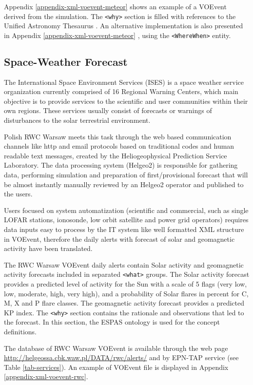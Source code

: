 \documentclass[referee,a4paper,12pt,traditabstract]{swsc}
\begin{document}
\begin{linenumbers}
Appendix \ref{appendix-xml-voevent-meteor} shows an example of a VOEvent derived from the simulation. The {\tt <why>} section is filled with references to the Unified Astronomy Thesaurus \cite{2014ASPC..485..461A}. An alternative implementation is also presented in Appendix \ref{appendix-xml-voevent-meteor} , using the {\tt <WhereWhen>} entity. 

\subsection{Space-Weather Forecast}
The International Space Environment Services (ISES) is a space weather service organization currently comprised of 16 Regional Warning Centers, which main objective is to provide services to the scientific and user communities within their own regions. These services usually consist of forecasts or warnings of disturbances to the solar terrestrial environment.

Polish RWC Warsaw meets this task through the web based communication channels like http and email protocols based on traditional codes and human readable text messages, created by the Heliogeophysical Prediction Service Laboratory. The data processing system (Helgeo2) is responsible for gathering data, performing simulation and preparation of first/provisional forecast that will be almost instantly manually reviewed by an Helgeo2 operator and published to the users. 

Users focused on system automatization (scientific and commercial, such as single LOFAR stations, ionosonde, low orbit satellite and power grid operators) requires data inputs easy to process by the IT system like well formatted XML structure in VOEvent, therefore the daily alerts with forecast of solar and geomagnetic activity have been translated. 

The RWC Warsaw VOEvent daily alerts contain Solar activity and geomagnetic activity forecasts included in separated  {\tt <what>} groups. The Solar activity forecast provides a predicted level of activity for the Sun with a scale of 5 flags (very low, low, moderate, high, very high), and a probability of Solar flares in percent for C, M, X and P flare classes. The geomagnetic activity forecast provides a predicted KP index. The {\tt <why>} section contains the rationale and observations that led to the forecast. In this section, the ESPAS \cite{Belehaki:2016bq} ontology is used for the concept definitions.

The database of RWC Warsaw VOEvent is available through the web page \url{http://helgeossa.cbk.waw.pl/DATA/rwc/alerts/} and by EPN-TAP service (see Table \ref{tab-services}). An example of VOEvent file is displayed in Appendix \ref{appendix-xml-voevent-rwc}.



\end{linenumbers}
\end{document}
